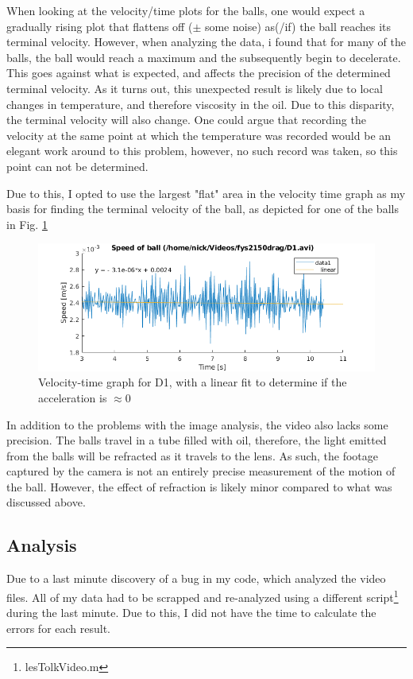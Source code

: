 \documentclass[11pt,a4paper]{article}
\begin{document}
    When looking at the velocity/time plots for the balls, one would expect a gradually rising plot that flattens off ($\pm$ some noise) as(/if) the ball reaches its terminal velocity. However, when analyzing the data, i found that for many of the balls, the ball would reach a maximum and the subsequently begin to decelerate. This goes against what is expected, and affects the precision of the determined terminal velocity. As it turns out, this unexpected result is likely due to local changes in temperature, and therefore viscosity in the oil. Due to this disparity, the terminal velocity will also change. One could argue that recording the velocity at the same point at which the temperature was recorded would be an elegant work around to this problem, however, no such record was taken, so this point can not be determined.

    Due to this, I opted to use the largest "flat" area in the velocity time graph as my basis for finding the terminal velocity of the ball, as depicted for one of the balls in Fig. \ref{fig:D1speed}
    \begin{figure}[H]
      \center
      \includegraphics[scale=0.7]{scripts/figs/D1_speed.png}
      \caption{Velocity-time graph for D1, with a linear fit to determine if the acceleration is $\approx 0$}
      \label{fig:D1speed}
    \end{figure}

    In addition to the problems with the image analysis, the video also lacks some precision. The balls travel in a tube filled with oil, therefore, the light emitted from the balls will be refracted as it travels to the lens. As such, the footage captured by the camera is not an entirely precise measurement of the motion of the ball. However, the effect of refraction is likely minor compared to what was discussed above. 
    
  \subsection{Analysis}
    Due to a last minute discovery of a bug in my code, which analyzed the video files. All of my data had to be scrapped and re-analyzed using a different script\footnote{lesTolkVideo.m} during the last minute. Due to this, I did not have the time to calculate the errors for each result.
\end{document}
